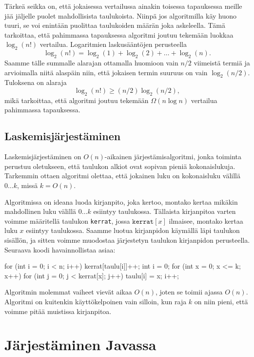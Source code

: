 Tärkeä seikka on, että jokaisessa vertailussa ainakin toisessa
tapauksessa meille jää jäljelle puolet mahdollisista taulukoista.
Niinpä jos algoritmilla käy huono tuuri, se voi enintään puolittaa
taulukoiden määrän joka askeleella.
Tämä tarkoittaa, että pahimmassa tapauksessa algoritmi joutuu
tekemään luokkaa $\log_2(n!)$ vertailua.
Logaritmien laskusääntöjen perusteella
\[
\log_2(n!) = \log_2(1)+\log_2(2)+\dots+\log_2(n).
\]
Saamme tälle summalle alarajan ottamalla huomioon vain
$n/2$ viimeistä termiä ja arvioimalla niitä alaspäin niin, 
että jokaisen termin suuruus on vain $\log_2(n/2)$. Tuloksena on alaraja
\[
\log_2(n!) \ge (n/2) \log_2(n/2),
\]
mikä tarkoittaa, että algoritmi joutuu
tekemään $\Omega(n \log n)$ vertailua pahimmassa tapauksessa.

\subsection{Laskemisjärjestäminen}

Laskemisjärjestäminen on $O(n)$-aikainen järjestämisalgoritmi,
jonka toiminta perustuu oletukseen, että taulukon alkiot
ovat sopivan pieniä kokonaislukuja.
Tarkemmin ottaen algoritmi olettaa, että jokainen luku on
kokonaisluku välillä $0 \dots k$, missä $k=O(n)$.

Algoritmissa on ideana luoda kirjanpito, joka kertoo,
montako kertaa mikäkin mahdollinen luku välillä $0 \dots k$
esiintyy taulukossa.
Tällaista kirjanpitoa varten voimme määritellä taulukon
\texttt{kerrat}, jossa $\texttt{kerrat}[x]$ ilmaisee,
montako kertaa luku $x$ esiintyy taulukossa.
Saamme luotua kirjanpidon käymällä läpi taulukon sisällön,
ja sitten voimme muodostaa järjestetyn taulukon
kirjanpidon perusteella.
Seuraava koodi havainnollistaa asiaa:

\begin{code}
for (int i = 0; i < n; i++) {
    kerrat[taulu[i]]++;
}
int i = 0;
for (int x = 0; x <= k; x++) {
    for (int j = 0; j < kerrat[x]; j++) {
        taulu[i] = x;
        i++;
    }
}
\end{code}

Algoritmin molemmat vaiheet vievät aikaa $O(n)$,
joten se toimii ajassa $O(n)$.
Algoritmi on kuitenkin käyttökelpoinen vain silloin,
kun raja $k$ on niin pieni, että voimme pitää
muistissa kirjanpitoa.

\section{Järjestäminen Javassa}

